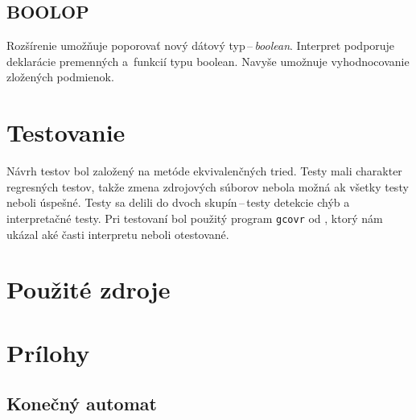 \documentclass[11pt,a4paper]{article}
\begin{document}
	\subsection{BOOLOP}
	Rozšírenie umožňuje poporovať nový dátový typ\,--\,\emph{boolean}. Interpret
	podporuje deklarácie premenných a~funkcií typu boolean. Navyše
	umožnuje vyhodnocovanie zložených podmienok.

	\section{Testovanie}
	\label{testovanie}
	Návrh testov bol založený na metóde ekvivalenčných tried. Testy mali charakter
	regresných testov, takže zmena zdrojových súborov nebola možná ak
	všetky testy neboli úspešné. Testy sa delili do dvoch skupín\,--\,testy
	detekcie chýb a interpretačné testy. Pri testovaní bol použitý program
	\texttt{gcovr} od \cite{COV}, ktorý nám ukázal aké časti interpretu neboli otestované.

	\section{Použité zdroje}
	{}
	

	\newpage
	\section{Prílohy}


	\subsection{Konečný automat}
	\label{app:automat}


	\newpage
\end{document}
